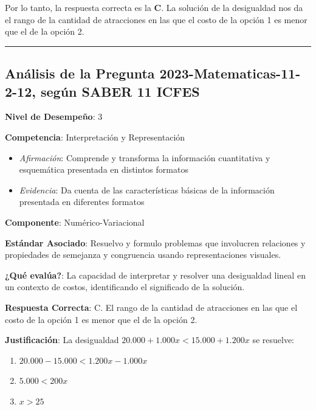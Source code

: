 \documentclass[
]{article}
\providecommand{\tightlist}{%
  \setlength{\itemsep}{0pt}\setlength{\parskip}{0pt}}
\begin{document}
Por lo tanto, la respuesta correcta es la \textbf{C}. La solución de la
desigualdad nos da el rango de la cantidad de atracciones en las que el
costo de la opción 1 es menor que el de la opción 2.

\begin{center}\rule{0.5\linewidth}{0.5pt}\end{center}

\subsection{Análisis de la Pregunta 2023-Matematicas-11-2-12, según
SABER 11
ICFES}\label{anuxe1lisis-de-la-pregunta-2023-matematicas-11-2-12-seguxfan-saber-11-icfes}

\textbf{Nivel de Desempeño}: 3

\textbf{Competencia}: Interpretación y Representación

\begin{itemize}
\tightlist
\item
  \emph{Afirmación}: Comprende y transforma la información cuantitativa
  y esquemática presentada en distintos formatos
\item
  \emph{Evidencia}: Da cuenta de las características básicas de la
  información presentada en diferentes formatos
\end{itemize}

\textbf{Componente}: Numérico-Variacional

\textbf{Estándar Asociado}: Resuelvo y formulo problemas que involucren
relaciones y propiedades de semejanza y congruencia usando
representaciones visuales.

\textbf{¿Qué evalúa?}: La capacidad de interpretar y resolver una
desigualdad lineal en un contexto de costos, identificando el
significado de la solución.

\textbf{Respuesta Correcta}: C. El rango de la cantidad de atracciones
en las que el costo de la opción 1 es menor que el de la opción 2.

\textbf{Justificación}: La desigualdad
\(20.000 + 1.000x < 15.000 + 1.200x\) se resuelve:

\begin{enumerate}
\def\labelenumi{\arabic{enumi}.}
\tightlist
\item
  \(20.000 - 15.000 < 1.200x - 1.000x\)
\item
  \(5.000 < 200x\)
\item
  \(x > 25\)
\end{enumerate}
\end{document}
